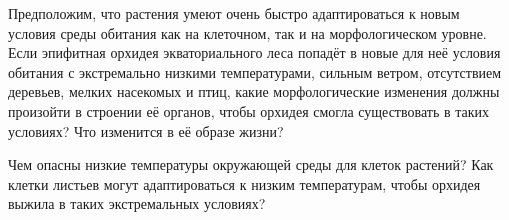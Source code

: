 
Предположим, что растения умеют очень быстро адаптироваться к новым условия среды обитания как на клеточном, 
так и на морфологическом уровне. Если эпифитная орхидея экваториального леса попадёт в новые для неё условия 
обитания с экстремально низкими температурами, сильным ветром, отсутствием деревьев, мелких насекомых и птиц, 
какие морфологические изменения должны произойти в строении её органов, чтобы орхидея смогла существовать в 
таких условиях? Что изменится в её образе жизни? 

Чем опасны низкие температуры окружающей среды для клеток растений? Как клетки листьев могут адаптироваться к 
низким температурам, чтобы орхидея выжила в таких экстремальных условиях?
